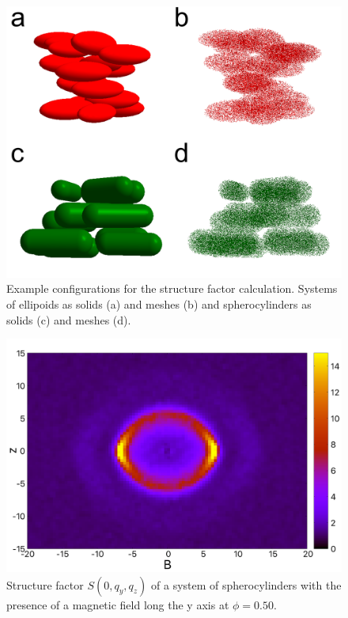 \documentclass{article}
\begin{document}
\begin{figure}
    \centering
    \includegraphics[width=0.5\columnwidth]{Scatteringmodel1.png}
    \caption{Example configurations for the structure factor calculation. Systems of ellipoids as solids (a) and meshes (b) and spherocylinders as solids (c) and meshes (d).}
    \label{fig:scatt_mod1}
\end{figure}

\begin{figure}
    \centering
    \includegraphics[width=1\columnwidth]{Syz_B_HE.png}
    \caption{Structure factor $S(0, q_y, q_z)$ of a system of spherocylinders with the presence of a magnetic field long the y axis at $\phi=0.50$.}
    \label{fig:Syz_B_HSC}
\end{figure}
\end{document}
